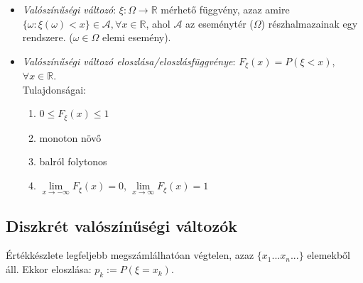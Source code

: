 \documentclass[margin=0px]{article}
\begin{document}
	\begin{itemize}
		\item \textit{Valószínűségi változó}: $\xi : \Omega \to \mathbb{R}$ mérhető függvény, azaz amire $\{\omega : \xi(\omega) < x\} \in \mathcal{A}, \forall x \in \mathbb{R}$, ahol $\mathcal{A}$ az eseménytér ($\Omega$) részhalmazainak egy rendszere. ($\omega \in \Omega$ elemi esemény).
		\item \textit{Valószínűségi változó eloszlása/eloszlásfüggvénye}: $F_{\xi}(x) = P(\xi < x)$, $\forall x \in \mathbb{R}$. \\
		Tulajdonságai:
		\begin{enumerate}
			\item $0 \leq F_{\xi}(x) \leq 1$
			\item monoton növő
			\item balról folytonos
			\item $\lim\limits_{x \to -\infty}{F_{\xi}(x)} = 0$, $\lim\limits_{x \to \infty}{F_{\xi}(x)} = 1$
		\end{enumerate}
	\end{itemize}
	
	\subsection{Diszkrét valószínűségi változók}
	
	Értékkészlete legfeljebb megszámlálhatóan végtelen, azaz $\{x_1 ... x_n ... \}$ elemekből áll. Ekkor eloszlása: $p_k := P(\xi = x_k)$.
	
\end{document}
